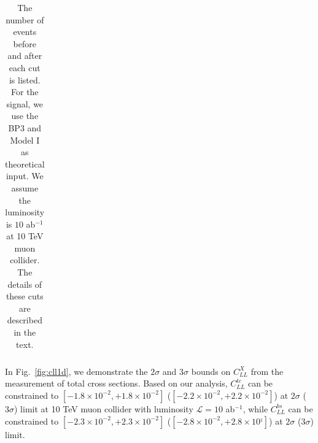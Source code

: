 \documentclass[a4paper,11pt]{article}
\begin{document}
\begin{center}
\begin{table}
\begin{center}
\begin{tabular}{|c|c|c|c|c|c|c|}
  \hline
  \end{tabular}
  \end{center}
  \caption{The number of events before and after each cut is listed. For the signal, we use the BP3 and Model I as theoretical input. We assume the luminosity is $10$ ab$^{-1}$ at 10 TeV muon collider. The details of these cuts are described in the text.\label{table:bs:cut}}
\end{table}
\end{center}

In Fig.~\ref{fig:cll1d}, we demonstrate the $2\sigma$ and $3\sigma$ bounds on $C^{X}_{LL}$ from the measurement of total cross sections. Based on our analysis, $C^{tc}_{LL}$ can be constrained to $[-1.8\times 10^{-2}, +1.8\times 10^{-2}]$ ($[-2.2\times 10^{-2}, +2.2\times10^{-2}]$) at $2\sigma$ ($3\sigma$) limit at 10 TeV muon collider with luminosity $\mathcal{L}=10$ ab$^{-1}$, while 
$C^{bs}_{LL}$ can be constrained to $[-2.3\times 10^{-2}, +2.3 \times 10^{-2}]$ ($[-2.8\times 10^{-2}, +2.8\times 10^{_2}]$) at $2\sigma$ ($3\sigma$) limit. 
\end{document}

